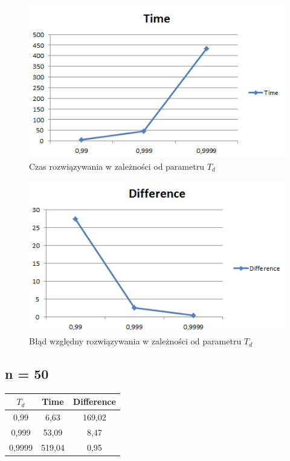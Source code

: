 \documentclass[wide,a4paper,titlepage,12pt] {article}
\begin{document}
\begin{figure}[htbp]
  \begin{center}
         \includegraphics[scale=0.8]{time40.PNG}
         \caption{Czas rozwiązywania w zależności od parametru $T_d$}
  \end{center}
\end{figure}

\begin{figure}[htbp]
  \begin{center}
         \includegraphics[scale=0.8]{diff40.PNG}
         \caption{Błąd względny rozwiązywania w zależności od parametru $T_d$}
  \end{center}
\end{figure}

\newpage
\subsection{n = 50}
\begin{center}
    \begin{tabular}{|c|c|c|}
      \hline
       $T_{d}$ & Time & Difference \\ \hline
       0,99 & 6,63 & 169,02 \\ \hline
       0,999 & 53,09 &8,47 \\ \hline
       0,9999 & 519,04 & 0,95 \\ \hline
  \end{tabular}
\end{center}
\end{document}
